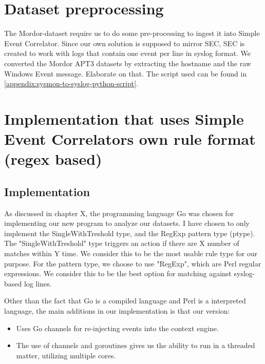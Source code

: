 \section{Dataset preprocessing}
\label{sec:datasetprocessing}

The Mordor-dataset require us to do some pre-processing to ingest it into Simple Event Correlator. Since our own solution is supposed to mirror SEC, 
SEC is created to work with logs that contain one event per line in syslog format. We converted the Mordor APT3 datasets by extracting the hostname and the raw Windows Event message. Elaborate on that. The script used can be found in \cref{appendix:sysmon-to-syslog-python-script}.

\iffalse
cat empire_apt3_2019-05-14223117.json | grep -i "Microsoft-Windows-Sysmon" | jq -c '. | {message: .message, hostname: .winlog.computer_name }' > ~/master-files/eventlogs/mordor/sysmon-empire.json

\fi

\section{Implementation that uses Simple Event Correlators own rule format (regex based)}

\subsection{Implementation}
As discussed in chapter X, the programming language Go was chosen for implementing our new program to analyze our datasets. I have chosen to only implement the SingleWithTreshold type, and the RegExp pattern type (ptype). The "SingleWithTreshold" type triggers an action if there are X number of matches within Y time. We consider this to be the most usable rule type for our purpose.  For the pattern type, we choose to use "RegExp", which are Perl regular expressions. We consider this to be the best option for matching against syslog-based log lines.

Other than the fact that Go is a compiled language and Perl is a interpreted language, the main additions in our implementation is that our version:
\begin{itemize}
    \item Uses Go channels for re-injecting events into the context engine.
    \item The use of channels and goroutines gives us the ability to run in a threaded matter, utilizing multiple cores.
\end{itemize}

